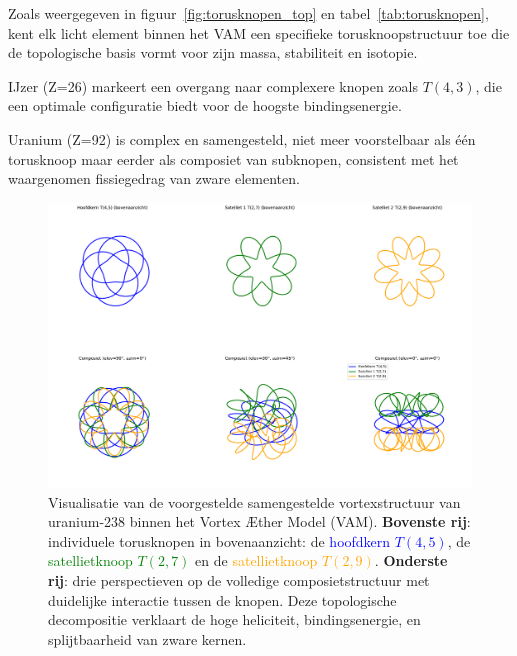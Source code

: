 Zoals weergegeven in figuur~\ref{fig:torusknopen_top} en tabel~\ref{tab:torusknopen}, kent elk licht element binnen het VAM een specifieke torusknoopstructuur toe die de topologische basis vormt voor zijn massa, stabiliteit en isotopie.


IJzer (Z=26) markeert een overgang naar complexere knopen zoals $T(4,3)$, die een optimale configuratie biedt voor de hoogste bindingsenergie.

Uranium (Z=92) is complex en samengesteld, niet meer voorstelbaar als één torusknoop maar eerder als composiet van subknopen, consistent met het waargenomen fissiegedrag van zware elementen.

\begin{figure}[H]
    \centering
    \includegraphics[width=\textwidth]{0_UraniumKnoop}
    \caption[Samengestelde vortexstructuur van uranium-238 in VAM]{
        Visualisatie van de voorgestelde samengestelde vortexstructuur van uranium-238 binnen het Vortex Æther Model (VAM).
        \textbf{Bovenste rij}: individuele torusknopen in bovenaanzicht:
        de \textcolor{blue}{hoofdkern \(T(4,5)\)}, de \textcolor{green}{satellietknoop \(T(2,7)\)} en de \textcolor{orange}{satellietknoop \(T(2,9)\)}.
        \textbf{Onderste rij}: drie perspectieven op de volledige composietstructuur met duidelijke interactie tussen de knopen.
        Deze topologische decompositie verklaart de hoge heliciteit, bindingsenergie, en splijtbaarheid van zware kernen.
    }
    \label{fig:uranium_2x3}
\end{figure}


